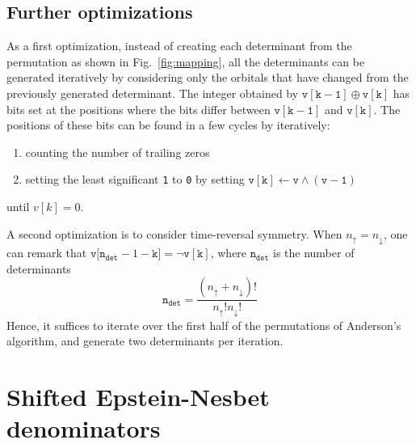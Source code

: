 \documentclass[aip,jcp,reprint,showkeys]{revtex4-1}
\newcommand{\up}{\uparrow}
\newcommand{\dn}{\downarrow}
\newcommand{\one}{{\texttt{1}}}
\newcommand{\zero}{{\texttt{0}}}
\begin{document}
\subsection{Further optimizations}

As a first optimization, instead of creating each determinant from the
permutation as shown in Fig.~\ref{fig:mapping}, all the determinants can be
generated iteratively by considering only the orbitals that have changed
from the previously generated determinant.
The integer obtained by $\mathtt{v[k-1]} \oplus \mathtt{v[k]}$ has bits set at
the positions where the bits differ between $\mathtt{v[k-1]}$ and
$\mathtt{v[k]}$. The positions of these bits can be found in a few cycles by
iteratively:
\begin{enumerate}
\item counting the number of trailing zeros
\item setting the least significant {\one} to {\zero} by setting
      $\mathtt{v[k] \gets v \wedge (v-1)}$
\end{enumerate}
until $v[k] = 0$. 

A second optimization is to consider time-reversal symmetry. When $n_\up =
n_\dn$, one can remark that ${\mathtt{v[n_{det}}-1-\mathtt{k]} = \neg \mathtt{v[k]}}$, 
where $\mathtt{n_{det}}$ is the number of determinants
\begin{equation}
\mathtt{n_{det}} = \frac{(n_\up +n_\dn)!}{n_\up! n_\dn!}
\end{equation}
Hence, it suffices to iterate over the first half of the permutations of Anderson's
algorithm, and generate two determinants per iteration.


\section{Shifted Epstein-Nesbet denominators}
\end{document}
